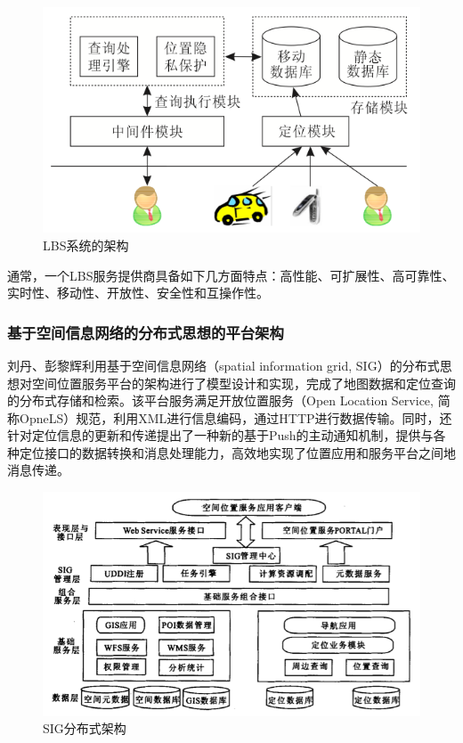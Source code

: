 \documentclass{article}
\begin{document}
\begin{CJK}{UTF8}{gbsn}
	\begin{figure}[htbp]
		\centering
		\includegraphics[bb=0 0 559 334, scale=0.45]{figure/fig_L10-2.png}
		\caption{LBS系统的架构}
		\label{fig:L10-2}
	\end{figure}

  通常，一个LBS服务提供商具备如下几方面特点\cite{L10}：高性能、可扩展性、高可靠性、实时性、移动性、开放性、安全性和互操作性。

	\subsubsection{基于空间信息网络的分布式思想的平台架构}
  刘丹、彭黎辉利用基于空间信息网络（spatial information grid, SIG）的分布式思想对空间位置服务平台的架构进行了模型设计和实现，完成了地图数据和定位查询的分布式存储和检索\cite{L08}。该平台服务满足开放位置服务（Open Location Service, 简称OpneLS）规范，利用XML进行信息编码，通过HTTP进行数据传输。同时，还针对定位信息的更新和传递提出了一种新的基于Push的主动通知机制，提供与各种定位接口的数据转换和消息处理能力，高效地实现了位置应用和服务平台之间地消息传递。

	\begin{figure}[htbp]
		\centering
		\includegraphics[bb=0 0 647 384, scale=0.45]{figure/fig_L08-4.png}
		\caption{SIG分布式架构}
		\label{fig:L08-4}
	\end{figure}


\end{CJK}
\end{document}

